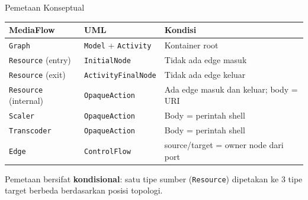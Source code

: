 \documentclass[aspectratio=169, table]{beamer}
\begin{document}
\begin{frame}{Pemetaan Konseptual}
\vspace{4pt}
\centering
\footnotesize
\begin{tabular}{|>{\raggedright\arraybackslash}p{}|>{\raggedright\arraybackslash}p{}|>{\raggedright\arraybackslash}p{}|}
\hline
\rowcolor{blue!12}
\textbf{MediaFlow} & \textbf{UML} & \textbf{Kondisi} \\
\hline
\texttt{Graph} & \texttt{Model} + \texttt{Activity} & Kontainer root \\
\hline
\texttt{Resource} (entry) & \texttt{InitialNode} & Tidak ada edge masuk \\
\hline
\texttt{Resource} (exit) & \texttt{ActivityFinalNode} & Tidak ada edge keluar \\
\hline
\texttt{Resource} (internal) & \texttt{OpaqueAction} & Ada edge masuk dan keluar; body = URI \\
\hline
\texttt{Scaler} & \texttt{OpaqueAction} & Body = perintah shell \\
\hline
\texttt{Transcoder} & \texttt{OpaqueAction} & Body = perintah shell \\
\hline
\texttt{Edge} & \texttt{ControlFlow} & source/target = owner node dari port \\
\hline
\end{tabular}
\vspace{6pt}

\small
Pemetaan bersifat \textbf{kondisional}: satu tipe sumber (\texttt{Resource}) dipetakan ke 3 tipe target berbeda berdasarkan posisi topologi.
\end{frame}
\end{document}
